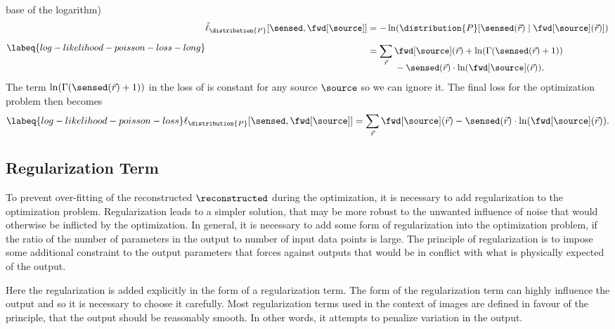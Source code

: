     base of the logarithm)
    \begin{equation}
      \labeq{log-likelihood-poisson-loss-long}
      \begin{split}
          \tilde{\ell}_{\distribution{P}}[\sensed, \fwd[\source]] &= -\ln(\distribution{P}[\sensed(\vec{r}) \mid
          \fwd[\source](\vec{r})]) \\[0.7em]
                                                                            &= \sum_{\vec{r}}\fwd[\source](\vec{r}) + \ln(\Gamma(\sensed(\vec{r}) + 1)) \\[-0.7em]
                                                                            &\hspace{3em}- \sensed(\vec{r})\cdot\ln(\fwd[\source](\vec{r})).
      \end{split}
    \end{equation}
The term \(\ln(\Gamma(\sensed(\vec{r}) + 1))\) in the loss of  is constant for
    any source \(\source\) so we can ignore it.
The final loss for the optimization problem then becomes
\begin{equation}
      \labeq{log-likelihood-poisson-loss}
          \ell_{\distribution{P}}[\sensed, \fwd[\source]] = \sum_{\vec{r}}\fwd[\source](\vec{r})- \sensed(\vec{r})\cdot\ln(\fwd[\source](\vec{r})).
\end{equation}

\subsection{Regularization Term}

To prevent over-fitting of the reconstructed \(\reconstructed\) during the optimization, it is necessary to add
    regularization to the optimization problem.
Regularization leads to a simpler solution, that may be more robust to the unwanted influence of noise that would 
    otherwise be inflicted by the optimization.
In general, it is necessary to add some form of regularization into the optimization problem, if the ratio  of the 
    number of parameters in the output to number of input data points is large.
The principle of regularization is to impose some additional constraint to the output parameters that forces against
    outputs that would be in conflict with what is physically expected of the output.


Here the regularization is added explicitly in the form of a regularization term.
The form of the regularization term can highly influence the output and so it is necessary to choose it carefully.
Most regularization terms used in the context of images are defined in favour of the principle, that the output should 
    be reasonably smooth.
In other words, it attempts to penalize variation in the output.

